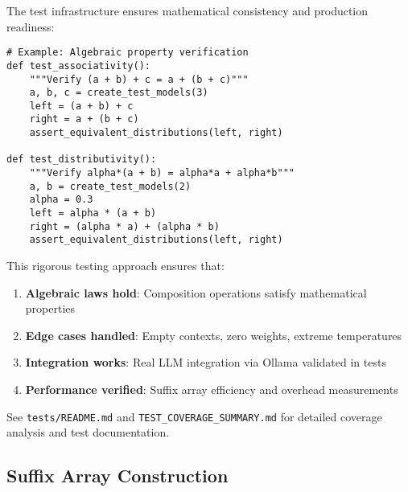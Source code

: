 \documentclass{article}
\theoremstyle{definition}
\begin{document}
The test infrastructure ensures mathematical consistency and production readiness:

\begin{lstlisting}
# Example: Algebraic property verification
def test_associativity():
    """Verify (a + b) + c = a + (b + c)"""
    a, b, c = create_test_models(3)
    left = (a + b) + c
    right = a + (b + c)
    assert_equivalent_distributions(left, right)

def test_distributivity():
    """Verify alpha*(a + b) = alpha*a + alpha*b"""
    a, b = create_test_models(2)
    alpha = 0.3
    left = alpha * (a + b)
    right = (alpha * a) + (alpha * b)
    assert_equivalent_distributions(left, right)
\end{lstlisting}

This rigorous testing approach ensures that:
\begin{enumerate}
    \item \textbf{Algebraic laws hold}: Composition operations satisfy mathematical properties
    \item \textbf{Edge cases handled}: Empty contexts, zero weights, extreme temperatures
    \item \textbf{Integration works}: Real LLM integration via Ollama validated in tests
    \item \textbf{Performance verified}: Suffix array efficiency and overhead measurements
\end{enumerate}

See \texttt{tests/README.md} and \texttt{TEST\_COVERAGE\_SUMMARY.md} for detailed coverage analysis and test documentation.

\subsection{Suffix Array Construction}
\end{document}
